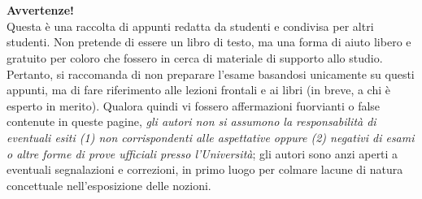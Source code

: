 \chapter*{}

\vspace*{0.3\paperheight}
\begin{center}
    \textbf{Avvertenze!}\\
    Questa è una raccolta di appunti redatta da studenti e
    condivisa per altri studenti. Non pretende di essere un libro
    di testo, ma una forma di aiuto libero e gratuito per coloro
    che fossero in cerca di materiale di supporto allo studio.
    Pertanto, si raccomanda di non preparare l'esame basandosi unicamente
    su questi appunti, ma di fare riferimento alle lezioni frontali
    e ai libri (in breve, a chi è esperto in merito). Qualora quindi
    vi fossero affermazioni fuorvianti o false contenute in queste
    pagine, \textit{gli autori non si assumono la responsabilità di eventuali
    esiti (1) non corrispondenti alle aspettative oppure (2) negativi di esami
    o altre forme di prove ufficiali presso l'Università}; gli autori sono anzi
    aperti a eventuali segnalazioni e correzioni, in primo luogo per colmare lacune di natura concettuale
    nell'esposizione delle nozioni.
\end{center}